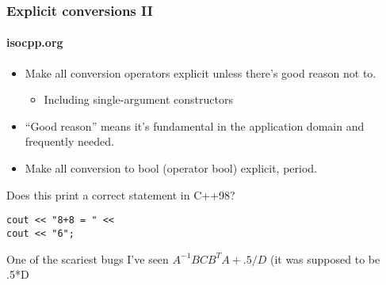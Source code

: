 \begin{frame}[fragile]
\frametitle{Explicit conversions II}
\framesubtitle{isocpp.org}


\begin{itemize}
\item Make all conversion operators explicit unless there's good
  reason not to.

  \begin{itemize}
    \item Including single-argument constructors
  \end{itemize}
\item ``Good reason'' means it's fundamental in the application domain
  and frequently needed.
\item Make all conversion to bool (operator bool) explicit, period.
\end{itemize}
\pause{}
Does this print a correct statement in C++98?
\begin{verbatim}
cout << "8+8 = " <<
cout << "6";
\end{verbatim}
\pause{}
One of the scariest bugs I've seen
\vskip 6pt
$A^{-1}BCB^TA + .5/D$
(it was supposed to be .5*D
\pause{}


\end{frame}
